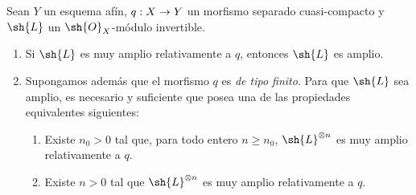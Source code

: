 \documentclass[oneside,10pt]{amsart}
\makeatletter
\renewcommand{\geq}{\geqslant}
\newcommand{\ega@arrow}[2]{\mathchoice{#1}{#2}{#2}{#2}}
\renewcommand{\to}{\ega@arrow{\longrightarrow}{\rightarrow}}
\let\EGAOriginalLabel\label
\renewcommand{\label}[1]{\phantomsection\EGAOriginalLabel{#1}}
\makeatother
\begin{document}
\begin{proposition}[4.5.10]
\label{II.4.5.10}
Sean $Y$ un esquema afín, $q:X\to Y$ un morfismo separado cuasi-compacto y $\sh{L}$ un $\sh{O}_X$-módulo invertible.
\begin{enumerate}
  \item[\rm{(i)}] Si $\sh{L}$ es muy amplio relativamente a $q$, entonces $\sh{L}$ es amplio.
  \item[\rm{(ii)}] Supongamos además que el morfismo $q$ es \emph{de tipo finito}.
    Para que $\sh{L}$ sea amplio, es necesario y suficiente que posea una de las propiedades equivalentes siguientes:
    \begin{enumerate}
      \item[\rm{(e)}] Existe $n_0>0$ tal que, para todo entero $n\geq n_0$, $\sh{L}^{\otimes n}$ es muy amplio relativamente a $q$.
      \item[\rm{(e')}] Existe $n>0$ tal que $\sh{L}^{\otimes n}$ es muy amplio relativamente a $q$.
    \end{enumerate}
\end{enumerate}
\end{proposition}
\end{document}
